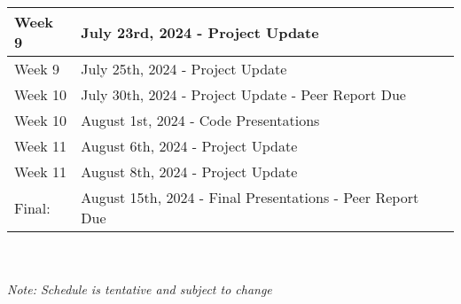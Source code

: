 \begin{tabular}{ | l | l |  }
    \hline
    Week 9 & July 23rd, 2024 - Project Update \\ 
    \hline
    Week 9 & July 25th, 2024 - Project Update \\ 
    \hline
    Week 10 & July 30th, 2024 - Project Update - Peer Report Due\\ 
    \hline
    Week 10 & August 1st, 2024 - Code Presentations \\ 
    \hline
    Week 11 & August 6th, 2024 - Project Update \\ 
    \hline
    Week 11 & August 8th, 2024 - Project Update \\ 
    \hline
    Final: & August 15th, 2024 - Final Presentations - Peer Report Due \\ 
    \hline
\end{tabular}
\\ \\
\textit{Note: Schedule is tentative and subject to change}

    